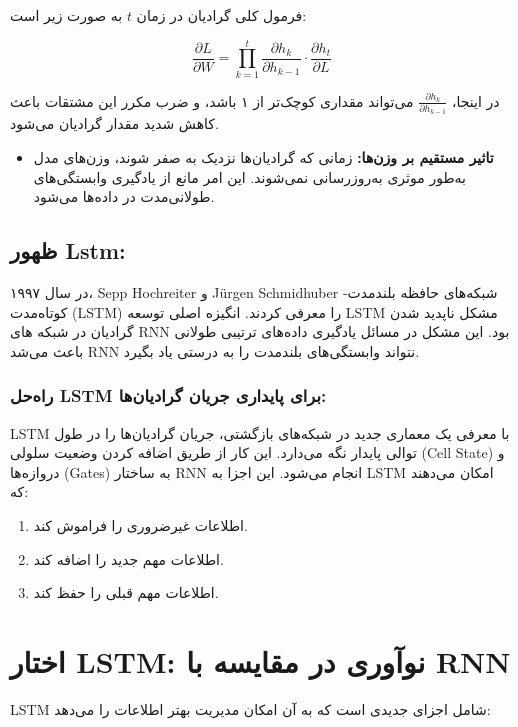 فرمول کلی گرادیان در زمان \( t \) به صورت زیر است:

\[
\frac{\partial L}{\partial W} = \prod_{k=1}^{t} \frac{\partial h_k}{\partial h_{k-1}} \cdot \frac{\partial h_t}{\partial L}
\]

در اینجا، \( \frac{\partial h_k}{\partial h_{k-1}} \) می‌تواند مقداری کوچک‌تر از ۱ باشد، و ضرب مکرر این مشتقات باعث کاهش شدید مقدار گرادیان می‌شود.

\begin{itemize}
	\item \textbf{تاثیر مستقیم بر وزن‌ها:} زمانی که گرادیان‌ها نزدیک به صفر شوند، وزن‌های مدل به‌طور موثری به‌روزرسانی نمی‌شوند. این امر مانع از یادگیری وابستگی‌های طولانی‌مدت در داده‌ها می‌شود.
\end{itemize}

\subsection{ظهور Lstm:}
در سال ۱۹۹۷، Sepp Hochreiter و Jürgen Schmidhuber شبکه‌های حافظه بلندمدت-کوتاه‌مدت (LSTM) را معرفی کردند. انگیزه اصلی توسعه LSTM مشکل ناپدید شدن گرادیان در شبکه های RNN بود. این مشکل در مسائل یادگیری داده‌های ترتیبی طولانی باعث می‌شد RNN نتواند وابستگی‌های بلندمدت را به درستی یاد بگیرد.


\subsubsection{راه‌حل LSTM برای پایداری جریان گرادیان‌ها:}

LSTM با معرفی یک معماری جدید در شبکه‌های بازگشتی، جریان گرادیان‌ها را در طول توالی پایدار نگه می‌دارد. این کار از طریق اضافه کردن وضعیت سلولی (Cell State) و دروازه‌ها (Gates) به ساختار RNN انجام می‌شود. این اجزا به LSTM امکان می‌دهند که:


\begin{enumerate}
	\item اطلاعات غیرضروری را فراموش کند.
	\item اطلاعات مهم جدید را اضافه کند.
	\item اطلاعات مهم قبلی را حفظ کند.
\end{enumerate}


\section{اختار LSTM: نوآوری در مقایسه با RNN}

LSTM شامل اجزای جدیدی است که به آن امکان مدیریت بهتر اطلاعات را می‌دهد:

